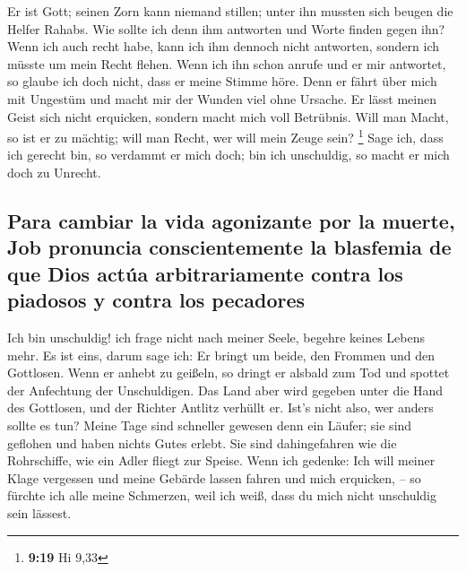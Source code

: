  Er ist Gott; seinen Zorn kann niemand stillen; unter ihn
mussten sich beugen die Helfer Rahabs.  Wie sollte ich
denn ihm antworten und Worte finden gegen ihn?  Wenn ich
auch recht habe, kann ich ihm dennoch nicht antworten, sondern ich
müsste um mein Recht flehen.  Wenn ich ihn schon anrufe
und er mir antwortet, so glaube ich doch nicht, dass er meine Stimme
höre.  Denn er fährt über mich mit Ungestüm und macht mir
der Wunden viel ohne Ursache.  Er lässt meinen Geist sich
nicht erquicken, sondern macht mich voll Betrübnis.  Will
man Macht, so ist er zu mächtig; will man Recht, wer will mein Zeuge
sein? \footnote{\textbf{9:19} Hi 9,33}  Sage ich, dass
ich gerecht bin, so verdammt er mich doch; bin ich unschuldig, so macht
er mich doch zu Unrecht.

\hypertarget{para-cambiar-la-vida-agonizante-por-la-muerte-job-pronuncia-conscientemente-la-blasfemia-de-que-dios-actuxfaa-arbitrariamente-contra-los-piadosos-y-contra-los-pecadores}{%
\subsection{Para cambiar la vida agonizante por la muerte, Job pronuncia
conscientemente la blasfemia de que Dios actúa arbitrariamente contra
los piadosos y contra los
pecadores}\label{para-cambiar-la-vida-agonizante-por-la-muerte-job-pronuncia-conscientemente-la-blasfemia-de-que-dios-actuxfaa-arbitrariamente-contra-los-piadosos-y-contra-los-pecadores}}

 Ich bin unschuldig! ich frage nicht nach meiner Seele,
begehre keines Lebens mehr.  Es ist eins, darum sage ich:
Er bringt um beide, den Frommen und den Gottlosen.  Wenn
er anhebt zu geißeln, so dringt er alsbald zum Tod und spottet der
Anfechtung der Unschuldigen.  Das Land aber wird gegeben
unter die Hand des Gottlosen, und der Richter Antlitz verhüllt er. Ist's
nicht also, wer anders sollte es tun?  Meine Tage sind
schneller gewesen denn ein Läufer; sie sind geflohen und haben nichts
Gutes erlebt.  Sie sind dahingefahren wie die
Rohrschiffe, wie ein Adler fliegt zur Speise.  Wenn ich
gedenke: Ich will meiner Klage vergessen und meine Gebärde lassen fahren
und mich erquicken, --  so fürchte ich alle meine
Schmerzen, weil ich weiß, dass du mich nicht unschuldig sein lässest.

